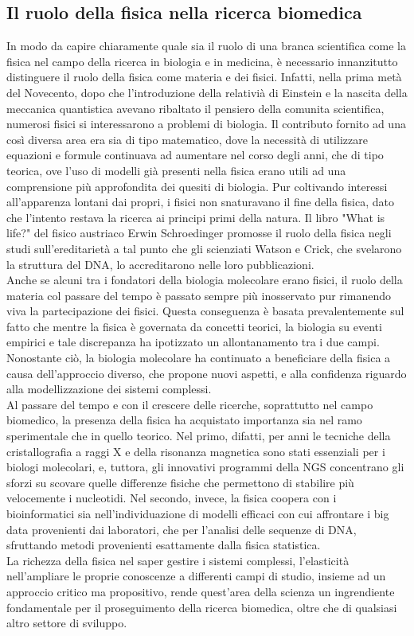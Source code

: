 \subsection{Il ruolo della fisica nella ricerca biomedica}       
In modo da capire chiaramente quale sia il ruolo di una branca scientifica come la fisica nel campo della ricerca in biologia e in medicina, è necessario innanzitutto distinguere il ruolo della fisica come materia e dei fisici. Infatti, nella prima metà del Novecento, dopo che l'introduzione della relativià di Einstein e la nascita della meccanica quantistica avevano ribaltato il pensiero della comunita scientifica, numerosi fisici si interessarono a problemi di biologia. Il contributo fornito ad una così diversa area era sia di tipo matematico, dove la necessità di utilizzare equazioni e formule continuava ad aumentare nel corso degli anni, che di tipo teorica, ove l'uso di modelli già presenti nella fisica erano utili ad una comprensione più approfondita dei quesiti di biologia. Pur coltivando interessi all'apparenza lontani dai propri, i fisici non snaturavano il fine della fisica, dato che l'intento restava la ricerca ai principi primi della natura. Il libro "What is life?" del fisico austriaco Erwin Schroedinger promosse il ruolo della fisica negli studi sull'ereditarietà a tal punto che gli scienziati Watson e Crick, che svelarono la struttura del DNA, lo accreditarono nelle loro pubblicazioni.\\
Anche se alcuni tra i fondatori della biologia molecolare erano fisici, il ruolo della materia col passare del tempo è passato sempre più inosservato pur rimanendo viva la partecipazione dei fisici. Questa conseguenza è basata prevalentemente sul fatto che mentre la fisica è governata da concetti teorici, la biologia su eventi empirici e tale discrepanza ha ipotizzato un allontanamento tra i due campi. Nonostante ciò, la biologia molecolare ha continuato a beneficiare della fisica a causa dell'approccio diverso, che propone nuovi aspetti, e alla confidenza riguardo alla modellizzazione dei sistemi complessi. \\
Al passare del tempo e con il crescere delle ricerche, soprattutto nel campo biomedico, la presenza della fisica ha acquistato importanza sia nel ramo sperimentale che in quello teorico. Nel primo, difatti, per anni le tecniche della cristallografia a raggi X e della risonanza magnetica sono stati essenziali per i biologi molecolari, e, tuttora, gli innovativi programmi della NGS concentrano gli sforzi su scovare quelle differenze fisiche che permettono di stabilire più velocemente i nucleotidi. Nel secondo, invece, la fisica coopera con i bioinformatici sia nell'individuazione di modelli efficaci con cui affrontare i big data provenienti dai laboratori, che per l'analisi delle sequenze di DNA, sfruttando metodi provenienti esattamente dalla fisica statistica.\\
La richezza della fisica nel saper gestire i sistemi complessi, l'elasticità nell'ampliare le proprie conoscenze a differenti campi di studio, insieme ad un approccio critico ma propositivo, rende quest'area della scienza un ingrendiente fondamentale per il proseguimento della ricerca biomedica, oltre che di qualsiasi altro settore di sviluppo.   

